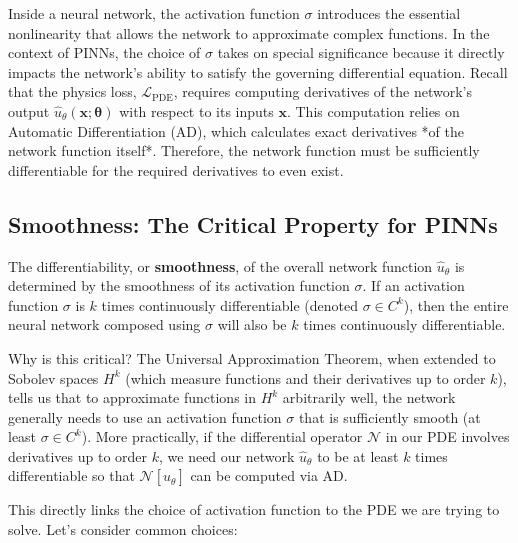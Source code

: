 Inside a neural network, the activation function $\sigma$ introduces the essential nonlinearity that allows the network to approximate complex functions. In the context of PINNs, the choice of $\sigma$ takes on special significance because it directly impacts the network's ability to satisfy the governing differential equation. Recall that the physics loss, $\mathcal{L}_{\text{PDE}}$, requires computing derivatives of the network's output $\hat{u}_\theta(\mathbf{x}; \boldsymbol{\theta})$ with respect to its inputs $\mathbf{x}$. This computation relies on Automatic Differentiation (AD), which calculates exact derivatives *of the network function itself*. Therefore, the network function must be sufficiently differentiable for the required derivatives to even exist.

\subsection{Smoothness: The Critical Property for PINNs}

The differentiability, or \textbf{smoothness}, of the overall network function $\hat{u}_\theta$ is determined by the smoothness of its activation function $\sigma$. If an activation function $\sigma$ is $k$ times continuously differentiable (denoted $\sigma \in C^k$), then the entire neural network composed using $\sigma$ will also be $k$ times continuously differentiable.

Why is this critical? The Universal Approximation Theorem, when extended to Sobolev spaces $H^k$ (which measure functions and their derivatives up to order $k$), tells us that to approximate functions in $H^k$ arbitrarily well, the network generally needs to use an activation function $\sigma$ that is sufficiently smooth (at least $\sigma \in C^k$). More practically, if the differential operator $\mathcal{N}$ in our PDE involves derivatives up to order $k$, we need our network $\hat{u}_\theta$ to be at least $k$ times differentiable so that $\mathcal{N}[\hat{u}_\theta]$ can be computed via AD.

This directly links the choice of activation function to the PDE we are trying to solve. Let's consider common choices:

